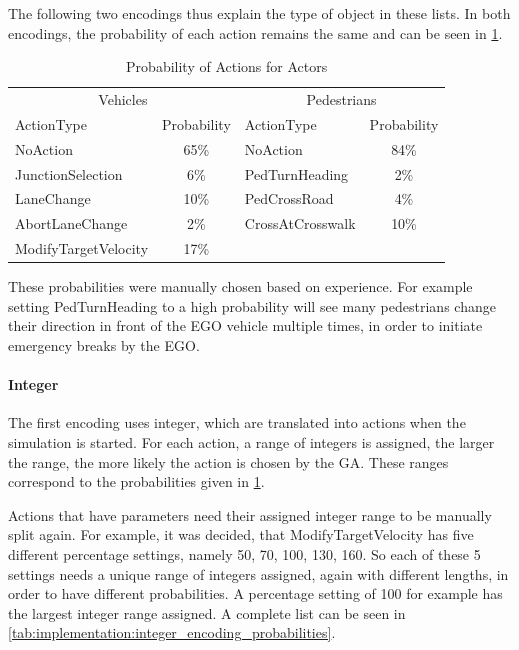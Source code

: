The following two encodings thus explain the type of object in these lists. In both encodings, the probability of each action remains the same and can be seen in \ref{tab:implementation:action_probabilities}.

\begin{table}[ht]
	\centering
	\begin{tabular}{lc|lc}
		\hline
		\multicolumn{2}{c|}{Vehicles} & \multicolumn{2}{c}{Pedestrians} \\
		ActionType & Probability & ActionType & Probability \\
		\hline
		NoAction & 65\% & NoAction & 84\% \\
		JunctionSelection & 6\% & PedTurnHeading & 2\% \\
		LaneChange & 10\% & PedCrossRoad & 4\% \\
		AbortLaneChange & 2\% & CrossAtCrosswalk & 10\% \\
		ModifyTargetVelocity & 17\% & & \\
		\hline
	\end{tabular}
	\caption{Probability of Actions for Actors}
	\label{tab:implementation:action_probabilities}
\end{table}

These probabilities were manually chosen based on experience. For example setting PedTurnHeading to a high probability will see many pedestrians change their direction in front of the EGO vehicle multiple times, in order to initiate emergency breaks by the EGO. 

\paragraph{Integer}
The first encoding uses integer, which are translated into actions when the simulation is started. For each action, a range of integers is assigned, the larger the range, the more likely the action is chosen by the GA. These ranges correspond to the probabilities given in \ref{tab:implementation:action_probabilities}.

Actions that have parameters need their assigned integer range to be manually split again. For example, it was decided, that ModifyTargetVelocity has five different percentage settings, namely 50, 70, 100, 130, 160. So each of these 5 settings needs a unique range of integers assigned, again with different lengths, in order to have different probabilities. A percentage setting of 100 for example has the largest integer range assigned. A complete list can be seen in \ref{tab:implementation:integer_encoding_probabilities}.


